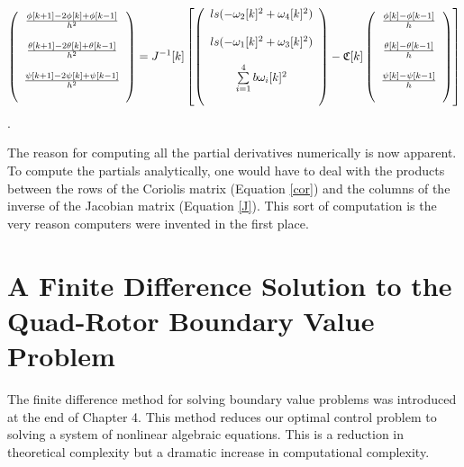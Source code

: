 \begin{equation}
    \left(
        \begin{array}{c}
           \frac{\phi[k+1] -2 \phi[k] + \phi[k-1]}{h^2}\\\\
           \frac{\theta[k+1] -2 \theta[k] + \theta[k-1]}{h^2}\\\\
           \frac{\psi[k+1] -2 \psi[k] + \psi[k-1]}{h^2}\\\\
        \end{array}
    \right) = J^{-1}[k]
    \left[ \left(
        \begin{array}{c}
            l s (-\omega_2[k]^2 + \omega_4[k]^2)\\\\
            l s (-\omega_1[k]^2 + \omega_3[k]^2)\\\\
            \sum \limits_{i=1}^4 b \omega_i[k]^2\\\\
        \end{array}
    \right) -
    \mathfrak{C}[k]
    \left(
        \begin{array}{c}
           \frac{\phi[k] - \phi[k-1]}{h} \\\\
           \frac{\theta[k] - \theta[k-1]}{h} \\\\
           \frac{\psi[k] - \psi[k-1]}{h} \\\\
        \end{array}
    \right)
    \right]
\end{equation} .

The reason for computing all the partial derivatives numerically is now apparent. To compute the partials analytically, one would have to deal with the products between the rows of the Coriolis matrix (Equation \ref{cor}) and the columns of the inverse of the Jacobian matrix (Equation \ref{J}). This sort of computation is the very reason computers were invented in the first place.


\section{A Finite Difference Solution to the Quad-Rotor Boundary Value Problem}

The finite difference method for solving boundary value problems was introduced at the end of Chapter 4. This method reduces our optimal control problem to solving a system of nonlinear algebraic equations. This is a reduction in theoretical complexity but a dramatic increase in computational complexity.

